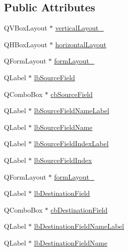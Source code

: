 \subsection*{Public Attributes}
\begin{DoxyCompactItemize}
\item 
Q\-V\-Box\-Layout $\ast$ \hyperlink{class_ui__mdt_field_map_item_dialog_afca0cc42ef29b59402cc25568810587f}{vertical\-Layout\-\_}
\item 
Q\-H\-Box\-Layout $\ast$ \hyperlink{class_ui__mdt_field_map_item_dialog_ab9bbd7e3f5754f832905d30529024094}{horizontal\-Layout}
\item 
Q\-Form\-Layout $\ast$ \hyperlink{class_ui__mdt_field_map_item_dialog_aeed0e8395f5f21cc0fab26f375f01dc6}{form\-Layout\-\_}
\item 
Q\-Label $\ast$ \hyperlink{class_ui__mdt_field_map_item_dialog_a43283c1b7d55df6d995a376e4d895150}{lb\-Source\-Field}
\item 
Q\-Combo\-Box $\ast$ \hyperlink{class_ui__mdt_field_map_item_dialog_af8e0ec7ce4f5c79781765040b331e008}{cb\-Source\-Field}
\item 
Q\-Label $\ast$ \hyperlink{class_ui__mdt_field_map_item_dialog_a5245255d699bb5e824231a1a64d96376}{lb\-Source\-Field\-Name\-Label}
\item 
Q\-Label $\ast$ \hyperlink{class_ui__mdt_field_map_item_dialog_a958e84acebe80166871853d42b8dd615}{lb\-Source\-Field\-Name}
\item 
Q\-Label $\ast$ \hyperlink{class_ui__mdt_field_map_item_dialog_a2c28b94e9577588a2318bff34c673ba5}{lb\-Source\-Field\-Index\-Label}
\item 
Q\-Label $\ast$ \hyperlink{class_ui__mdt_field_map_item_dialog_a421539356822e2719359f1f8897b9ccd}{lb\-Source\-Field\-Index}
\item 
Q\-Form\-Layout $\ast$ \hyperlink{class_ui__mdt_field_map_item_dialog_ae88b9938c970171ff5bb0a6b76e5439a}{form\-Layout\-\_}
\item 
Q\-Label $\ast$ \hyperlink{class_ui__mdt_field_map_item_dialog_ae1be4528c624e390e535ee2227fcd84b}{lb\-Destination\-Field}
\item 
Q\-Combo\-Box $\ast$ \hyperlink{class_ui__mdt_field_map_item_dialog_a6cdf15157ac609486126eb129762af6b}{cb\-Destination\-Field}
\item 
Q\-Label $\ast$ \hyperlink{class_ui__mdt_field_map_item_dialog_a56d6141428c071bb547979d56a9f72ef}{lb\-Destination\-Field\-Name\-Label}
\item 
Q\-Label $\ast$ \hyperlink{class_ui__mdt_field_map_item_dialog_a62b58e5f7e136007355ac558c9c0aa03}{lb\-Destination\-Field\-Name}

\end{DoxyCompactItemize}
